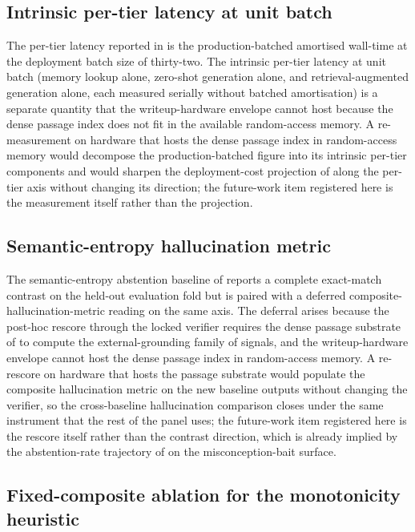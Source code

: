 \subsection{Intrinsic per-tier latency at unit batch}
\label{sec:future-latency}

The per-tier latency reported in  is the production-batched amortised wall-time at the deployment batch size of thirty-two. The intrinsic per-tier latency at unit batch (memory lookup alone, zero-shot generation alone, and retrieval-augmented generation alone, each measured serially without batched amortisation) is a separate quantity that the writeup-hardware envelope cannot host because the dense passage index does not fit in the available random-access memory. A re-measurement on hardware that hosts the dense passage index in random-access memory would decompose the production-batched figure into its intrinsic per-tier components and would sharpen the deployment-cost projection of  along the per-tier axis without changing its direction; the future-work item registered here is the measurement itself rather than the projection.

\subsection{Semantic-entropy hallucination metric}
\label{sec:future-se-chm}

The semantic-entropy abstention baseline of  reports a complete exact-match contrast on the held-out evaluation fold but is paired with a deferred composite-hallucination-metric reading on the same axis. The deferral arises because the post-hoc rescore through the locked verifier requires the dense passage substrate of  to compute the external-grounding family of signals, and the writeup-hardware envelope cannot host the dense passage index in random-access memory. A re-rescore on hardware that hosts the passage substrate would populate the composite hallucination metric on the new baseline outputs without changing the verifier, so the cross-baseline hallucination comparison closes under the same instrument that the rest of the panel uses; the future-work item registered here is the rescore itself rather than the contrast direction, which is already implied by the abstention-rate trajectory of  on the misconception-bait surface.

\subsection{Fixed-composite ablation for the monotonicity heuristic}
\label{sec:future-fixed-composite}

